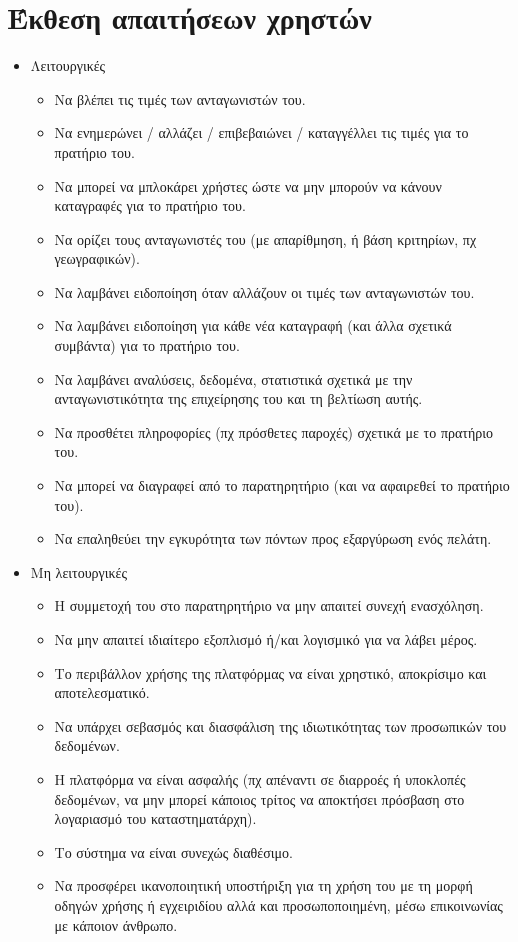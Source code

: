 \documentclass[a4paper,oneside, 12pt]{article}
\begin{document}
\section{Έκθεση απαιτήσεων χρηστών}
\begin{itemize}
	\item Λειτουργικές
	{
		\begin{itemize}
			\item Να βλέπει τις τιμές των ανταγωνιστών του.
			\item  Να ενημερώνει / αλλάζει / επιβεβαιώνει / καταγγέλλει τις τιμές για το
			πρατήριο του.
			\item  Να μπορεί να μπλοκάρει χρήστες ώστε να μην μπορούν να κάνουν
			καταγραφές για το πρατήριο του.
			\item  Να ορίζει τους ανταγωνιστές του (με απαρίθμηση, ή βάση κριτηρίων, πχ
			γεωγραφικών).
			\item  Να λαμβάνει ειδοποίηση όταν αλλάζουν οι τιμές των ανταγωνιστών του.
			\item  Να λαμβάνει ειδοποίηση για κάθε νέα καταγραφή (και άλλα σχετικά
			συμβάντα) για το πρατήριο του.
			\item  Να λαμβάνει αναλύσεις, δεδομένα, στατιστικά σχετικά με την
			ανταγωνιστικότητα της επιχείρησης του και τη βελτίωση αυτής.
			\item  Να προσθέτει πληροφορίες (πχ πρόσθετες παροχές) σχετικά με το πρατήριο
			του.
			\item  Να μπορεί να διαγραφεί από το παρατηρητήριο (και να αφαιρεθεί το πρατήριο
			του).
			\item  Να επαληθεύει την εγκυρότητα των πόντων προς εξαργύρωση ενός πελάτη.
		\end{itemize}
	}
	\item Μη λειτουργικές
	{
		\begin{itemize}
			\item Η συμμετοχή του στο παρατηρητήριο να μην απαιτεί συνεχή ενασχόληση.
			\item Να μην απαιτεί ιδιαίτερο εξοπλισμό ή/και λογισμικό για να λάβει μέρος.
			\item Το περιβάλλον χρήσης της πλατφόρμας να είναι χρηστικό, αποκρίσιμο και
			αποτελεσματικό.
			\item Να υπάρχει σεβασμός και διασφάλιση της ιδιωτικότητας των προσωπικών του
			δεδομένων.
			\item Η πλατφόρμα να είναι ασφαλής (πχ απέναντι σε διαρροές ή υποκλοπές
			δεδομένων, να μην μπορεί κάποιος τρίτος να αποκτήσει πρόσβαση στο
			λογαριασμό του καταστηματάρχη).
			\item Το σύστημα να είναι συνεχώς διαθέσιμο.
			\item Να προσφέρει ικανοποιητική υποστήριξη για τη χρήση του με τη μορφή
			οδηγών χρήσης ή εγχειριδίου αλλά και προσωποποιημένη, μέσω επικοινωνίας
			με κάποιον άνθρωπο.
		\end{itemize}
	}
\end{itemize}
\end{document}
